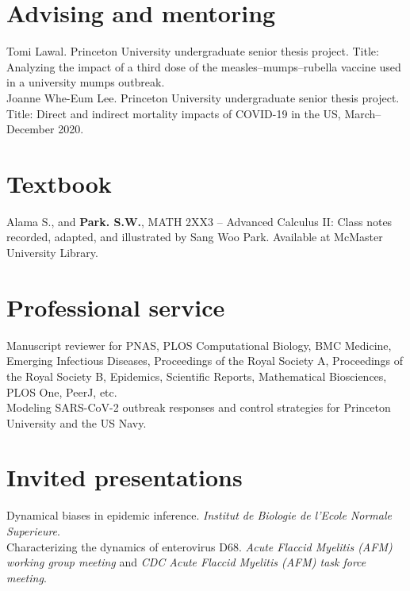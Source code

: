 \documentclass[11pt]{article} %
\begin{document}
\section*{Advising and mentoring}

 Tomi Lawal. Princeton University undergraduate senior thesis project. Title: Analyzing the impact of a third dose of the measles--mumps--rubella vaccine used in a university mumps outbreak.\\

 Joanne Whe-Eum Lee. Princeton University undergraduate senior thesis project. Title: Direct and indirect mortality impacts of COVID-19 in the US, March--December 2020.

\section*{Textbook}

 Alama S., and \textbf{Park. S.W.}, MATH 2XX3 -- Advanced Calculus II: Class notes recorded, adapted, and illustrated by Sang Woo Park. Available at McMaster University Library.

\section*{Professional service}

Manuscript reviewer for PNAS, PLOS Computational Biology, BMC Medicine, Emerging Infectious Diseases, Proceedings of the Royal Society A, Proceedings of the Royal Society B, Epidemics, Scientific Reports, Mathematical Biosciences, PLOS One, PeerJ, etc.\\

Modeling SARS-CoV-2 outbreak responses and control strategies for Princeton University and the US Navy. 

\section*{Invited presentations}

 Dynamical biases in epidemic inference. \textit{Institut de Biologie de l'Ecole Normale Superieure}.\\

 Characterizing the dynamics of enterovirus D68. \textit{Acute Flaccid Myelitis (AFM) working group meeting} and \textit{CDC Acute Flaccid Myelitis (AFM) task force meeting}.\\
\end{document}
